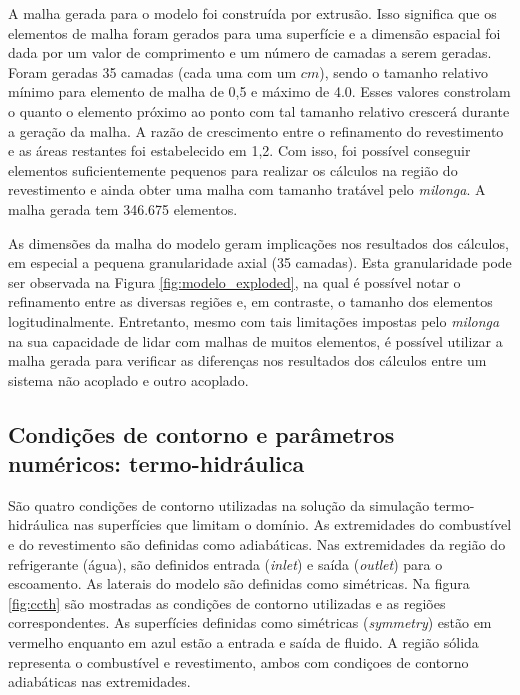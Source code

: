A malha gerada para o modelo foi construída por extrusão. Isso significa que
os elementos de malha foram gerados para uma superfície e a dimensão espacial
foi dada por um valor de comprimento e um número de camadas a serem geradas.
Foram geradas 35 camadas (cada uma com um $cm$), sendo o tamanho relativo
mínimo para elemento de malha de 0,5 e máximo de 4.0. Esses valores constrolam
o quanto o elemento próximo ao ponto com tal tamanho relativo crescerá durante
a geração da malha. A razão de crescimento entre o refinamento do revestimento
e as áreas restantes foi estabelecido em 1,2. Com isso, foi possível conseguir
elementos suficientemente pequenos para realizar os cálculos na região
do revestimento e ainda obter uma malha com tamanho tratável pelo \textit{milonga}.
A malha gerada tem 346.675 elementos.

As dimensões da malha do modelo geram implicações nos resultados dos cálculos, em
especial a pequena granularidade axial (35 camadas). Esta granularidade
pode ser observada na Figura \ref{fig:modelo_exploded},
na qual é possível notar
o refinamento entre as diversas regiões e, em contraste, o tamanho dos elementos logitudinalmente.
Entretanto, mesmo com tais
limitações impostas pelo \textit{milonga} na sua capacidade de lidar
com malhas de muitos elementos, é possível utilizar a malha gerada para verificar
as diferenças nos resultados dos cálculos entre um sistema não acoplado e outro acoplado.


\subsection{Condições de contorno e parâmetros numéricos: termo-hidráulica}
\label{subsec:ccth}


São quatro condições de contorno utilizadas na solução da simulação termo-hidráulica
nas superfícies que limitam o domínio. As extremidades do combustível e do revestimento
são definidas como adiabáticas. Nas
extremidades da região do refrigerante (água), são definidos entrada (\textit{inlet}) e
saída (\textit{outlet}) para o escoamento. As laterais do modelo são definidas
como simétricas. Na figura \ref{fig:ccth} são mostradas as condições de contorno
utilizadas e as regiões correspondentes. As superfícies definidas como simétricas (\textit{symmetry})
estão em vermelho
enquanto em azul estão a entrada e saída de fluido. A região sólida representa o
combustível e revestimento, ambos com condiçoes de contorno adiabáticas nas extremidades.

